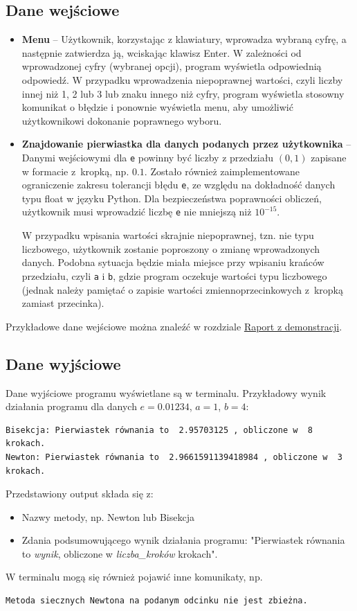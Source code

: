 \documentclass[12pt]{article}
\begin{document}
\subsection{Dane wejściowe}
\begin{itemize}
\item \textbf{Menu} – Użytkownik, korzystając z klawiatury, wprowadza wybraną cyfrę, a następnie zatwierdza ją, wciskając klawisz Enter. W zależności od wprowadzonej cyfry (wybranej opcji), program wyświetla odpowiednią odpowiedź. W przypadku wprowadzenia niepoprawnej wartości, czyli liczby innej niż 1, 2 lub 3 lub znaku innego niż cyfry, program wyświetla stosowny komunikat o błędzie i ponownie wyświetla menu, aby umożliwić użytkownikowi dokonanie poprawnego wyboru.

\item \textbf{Znajdowanie pierwiastka dla danych podanych przez użytkownika} – Danymi wejściowymi dla \verb|e| powinny być liczby z przedziału $(0, 1)$ zapisane w formacie z~kropką, np. $0.1$. Zostało również zaimplementowane ograniczenie zakresu tolerancji błędu \verb|e|, ze względu na dokładność danych typu float w języku Python. Dla bezpieczeństwa poprawności obliczeń, użytkownik musi wprowadzić liczbę \verb|e| nie mniejszą niż $10^{-15}$.

W przypadku wpisania wartości skrajnie niepoprawnej, tzn. nie typu liczbowego, użytkownik zostanie poproszony o zmianę wprowadzonych danych. Podobna sytuacja będzie miała miejsce przy wpisaniu krańców przedziału, czyli \verb|a| i \verb|b|, gdzie program oczekuje wartości typu liczbowego (jednak należy pamiętać o zapisie wartości zmiennoprzecinkowych z~kropką zamiast przecinka).
\end{itemize}
Przykładowe dane wejściowe można znaleźć w rozdziale \hyperref[sec:raport]{Raport z demonstracji}. 
\subsection{Dane wyjściowe}
Dane wyjściowe programu wyświetlane są w terminalu.
Przykładowy wynik działania programu dla danych $e=0.01234$, $a=1$, $b=4$:
\begin{verbatim}
Bisekcja: Pierwiastek równania to  2.95703125 , obliczone w  8  krokach.
Newton: Pierwiastek równania to  2.9661591139418984 , obliczone w  3  krokach.
\end{verbatim}
Przedstawiony output składa się z:
\begin{itemize}
\item Nazwy metody, np. Newton lub Bisekcja
\item Zdania podsumowującego wynik działania programu: "Pierwiastek równania to \textit{wynik}, obliczone w \textit{liczba\_kroków} krokach".
\end{itemize}
W terminalu mogą się również pojawić inne komunikaty, np.
\begin{verbatim}
Metoda siecznych Newtona na podanym odcinku nie jest zbieżna.
\end{verbatim}
\end{document}
